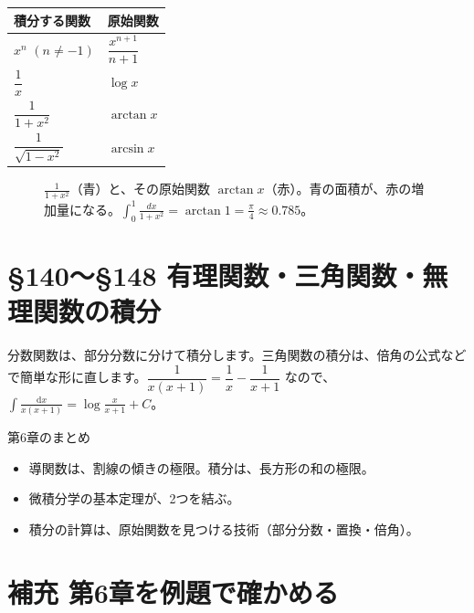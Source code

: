 \documentclass[a4paper,11pt,openany]{ltjsbook}
\newcommand{\dd}{\mathrm{d}}
\begin{document}
\begin{center}
\begin{tabular}{ll}
\toprule
積分する関数 & 原始関数\\
\midrule
$x^n$ $(n\ne-1)$ & $\dfrac{x^{n+1}}{n+1}$\\
$\dfrac1x$ & $\log x$\\
$\dfrac1{1+x^2}$ & $\arctan x$\\
$\dfrac1{\sqrt{1-x^2}}$ & $\arcsin x$\\
\bottomrule
\end{tabular}
\end{center}

\begin{figure}[htbp]
\centering
{}
\caption{$\frac1{1+x^2}$（青）と、その原始関数 $\arctan x$（赤）。青の面積が、赤の増加量になる。$\int_0^1\frac{dx}{1+x^2}=\arctan1=\frac\pi4\approx0.785$。}
\end{figure}

\section{§140〜§148 有理関数・三角関数・無理関数の積分}

分数関数は、部分分数に分けて積分します。三角関数の積分は、倍角の公式などで簡単な形に直します。$\dfrac{1}{x(x+1)}=\dfrac1x-\dfrac1{x+1}$ なので、$\displaystyle\int\frac{\dd x}{x(x+1)}=\log\frac{x}{x+1}+C$。

\begin{pointbox}{第6章のまとめ}
\begin{itemize}[leftmargin=1.5em]
\item 導関数は、割線の傾きの極限。積分は、長方形の和の極限。
\item 微積分学の基本定理が、2つを結ぶ。
\item 積分の計算は、原始関数を見つける技術（部分分数・置換・倍角）。
\end{itemize}
\end{pointbox}

\section{補充 第6章を例題で確かめる}
\end{document}
